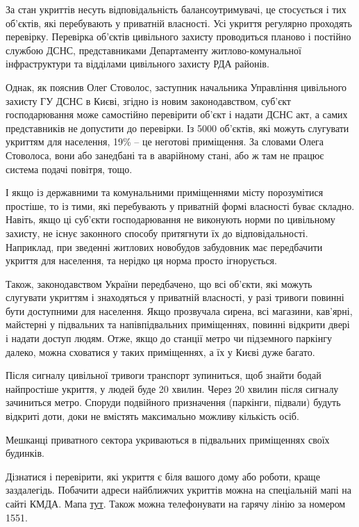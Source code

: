 
За стан укриттів несуть відповідальність балансоутримувачі, це стосується і тих
об’єктів, які перебувають у приватній власності. Усі укриття регулярно
проходять перевірку. Перевірка об’єктів цивільного захисту проводиться планово
і постійно службою ДСНС, представниками Департаменту житлово-комунальної
інфраструктури та відділами цивільного захисту РДА районів.  

Однак, як пояснив Олег Стоволос, заступник начальника Управління цивільного
захисту ГУ  ДСНС в Києві, згідно із новим законодавством, суб’єкт
господарювання може самостійно перевірити об’єкт і надати ДСНС акт, а самих
представників не допустити до перевірки. Із 5000 об’єктів, які можуть слугувати
укриттям для населення, 19\% – це неготові приміщення. За словами Олега
Стоволоса, вони або занедбані та в аварійному стані, або ж там не працює
система подачі повітря, тощо.

І якщо із державними та комунальними приміщеннями місту порозумітися простіше,
то із тими, які перебувають у приватній формі власності буває складно. Навіть,
якщо ці суб’єкти господарювання не виконують норми по цивільному захисту, не
існує законного способу притягнути їх до відповідальності. Наприклад, при
зведенні житлових новобудов забудовник має передбачити укриття для населення,
та нерідко ця норма просто ігнорується.


Також, законодавством України передбачено, що всі об’єкти, які можуть слугувати
укриттям і знаходяться у приватній власності, у разі тривоги повинні бути
доступними для населення. Якщо прозвучала сирена, всі магазини, кав’ярні,
майстерні у підвальних та напівпідвальних приміщеннях, повинні відкрити двері і
надати доступ людям. Отже, якщо до станції метро чи підземного паркінгу далеко,
можна сховатися у таких приміщеннях, а їх у Києві дуже багато.

Після сигналу цивільної тривоги транспорт зупиниться, щоб знайти бодай
найпростіше укриття, у людей буде 20 хвилин. Через 20 хвилин після сигналу
зачиниться метро. Споруди подвійного призначення (паркінги, підвали) будуть
відкриті доти, доки не вмістять максимально можливу кількість осіб. 

Мешканці приватного сектора укриваються в підвальних приміщеннях своїх
будинків.

Дізнатися і перевірити, які укриття є біля вашого дому або роботи, краще
заздалегідь. Побачити адреси найближчих укриттів можна на спеціальній мапі на
сайті КМДА. Мапа \href{https://www.google.com/maps/d/viewer?mid=1GoP1MtW6Zpmn_0-VXnleUBPa-NXBqGS_&ll=50.43993412053319%2C30.45604198386075&z=11}{тут}. Також можна телефонувати на гарячу лінію за номером 1551.

